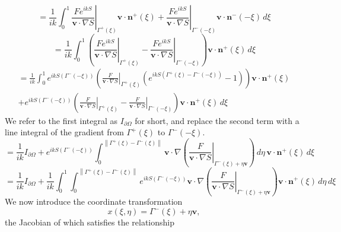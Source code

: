 \documentclass{article}
\newcommand{\norm}[1]{\left\lVert #1 \right\rVert}
\theoremstyle{plain}
\begin{document}
\begin{equation}
	= \frac{1}{ik} \int_{0}^1 \left. \frac{Fe^{ikS}}{\mathbf{v}\cdot\nabla S} \right\rvert_{\Gamma^+(\xi)} \mathbf{v}\cdot \mathbf{n}^+(\xi)
	+ \left. \frac{Fe^{ikS}}{\mathbf{v}\cdot\nabla S} \right\rvert_{\Gamma^-(-\xi)} \mathbf{v}\cdot \mathbf{n}^-(-\xi) \,d\xi
\end{equation}
\begin{equation}
	= \frac{1}{ik} \int_0^1 \left( \left. \frac{Fe^{ikS}}{\mathbf{v}\cdot\nabla S} \right\rvert_{\Gamma^+(\xi)}
	- \left. \frac{Fe^{ikS}}{\mathbf{v}\cdot\nabla S} \right\rvert_{\Gamma^-(-\xi)}
	\right) \mathbf{v}\cdot\mathbf{n}^+(\xi) \,d\xi
\end{equation}
\begin{multline}
	= \frac{1}{ik} \int_0^1 e^{ikS\left( \Gamma^-(-\xi) \right)}
	\left( \left. \frac{F}{\mathbf{v}\cdot\nabla S} \right\rvert_{\Gamma^+(\xi)}
	\left( e^{ikS\left( \Gamma^+(\xi) - \Gamma^-(-\xi) \right)} -1\right)
	\right) \mathbf{v}\cdot\mathbf{n}^+(\xi) \\
	+ e^{ikS\left( \Gamma^-(-\xi) \right)} \left(
	\left. \frac{F}{\mathbf{v}\cdot\nabla S} \right\rvert_{\Gamma^+(\xi)}
	- \left. \frac{F}{\mathbf{v}\cdot\nabla S} \right\rvert_{\Gamma^-(-\xi)}
	\right) \mathbf{v}\cdot\mathbf{n}^+(\xi) \,d\xi
\end{multline}
We refer to the first integral as $I_{\partial\Omega}$ for short,
and replace the second term with a line integral of the gradient from $\Gamma^+(\xi)$ to $\Gamma^-(-\xi)$.
\begin{equation}
	= \frac{1}{ik} I_{\partial\Omega}
	+ e^{ikS\left( \Gamma^-(-\xi) \right)} 
	\int_0^{\norm{\Gamma^+(\xi) - \Gamma^-(\xi)}} \mathbf{v}\cdot\nabla\left(
	\left. \frac{F}{\mathbf{v}\cdot\nabla S} \right\rvert_{\Gamma^-(\xi) + \eta\mathbf{v}}
	\right) \,d\eta \, \mathbf{v}\cdot\mathbf{n}^+(\xi) \,d\xi
\end{equation}
\begin{equation}
	= \frac{1}{ik} I_{\partial\Omega}
	+ \frac{1}{ik} \int_0^1 \int_0^{\norm{\Gamma^+(\xi) - \Gamma^-(\xi)}}
	e^{ikS\left( \Gamma^-(-\xi) \right)} \mathbf{v}\cdot\nabla\left(
	\left. \frac{F}{\mathbf{v}\cdot\nabla S} \right\rvert_{\Gamma^-(\xi) + \eta\mathbf{v}}
	\right) \mathbf{v}\cdot\mathbf{n}^+(\xi) \,d\eta \,d\xi
\end{equation}
We now introduce the coordinate transformation
\begin{equation}
	x(\xi,\eta) = \Gamma^-(\xi) + \eta\mathbf{v},
\end{equation}
the Jacobian of which satisfies the relationship
\end{document}
